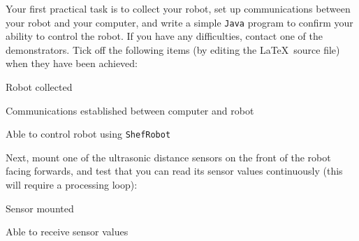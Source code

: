 \documentclass[hidelinks,a4paper,11pt]{article}
\newcommand{\cmark}{\ding{51}}%
\newcommand{\done}{\rlap{$\square$}{\raisebox{2pt}{\large\hspace{1pt}\cmark}}
\hspace{-2.5pt}}
\begin{document}
Your first practical task is to collect your robot, set up communications between your robot and
your computer, and write a simple \texttt{Java} program to confirm your ability to control the
robot.   If you have any difficulties, contact one of the demonstrators.  Tick off the following
items (by editing the \LaTeX\ source file) when they have been achieved:

\begin{todolist}
	\item[\done] Robot collected
  	\item[\done] Communications established between computer and robot
	\item[\done] Able to control robot using \texttt{ShefRobot}
\end{todolist}

Next, mount one of the ultrasonic distance sensors on the front of the robot facing forwards, and
test that you can read its sensor values continuously (this will require a processing loop):

\begin{todolist}
	\item[\done] Sensor mounted
	\item[\done] Able to receive sensor values
\end{todolist}
\end{document}
